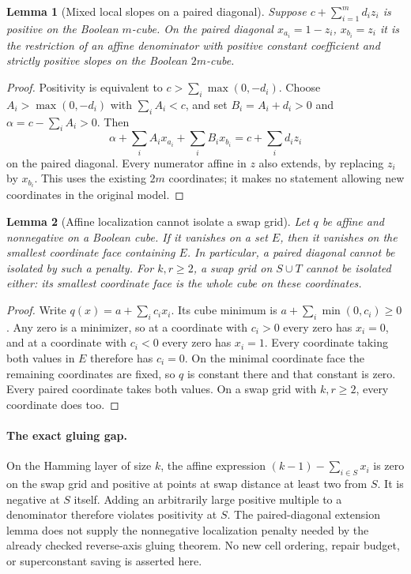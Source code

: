 \documentclass[11pt]{article}
\newtheorem{lemma}{Lemma}
\begin{document}
\begin{lemma}[Mixed local slopes on a paired diagonal]
Suppose $c+\sum_{i=1}^m d_i z_i$ is positive on the Boolean $m$-cube.
On the paired diagonal $x_{a_i}=1-z_i$, $x_{b_i}=z_i$ it is the
restriction of an affine denominator with positive constant coefficient
and strictly positive slopes on the Boolean $2m$-cube.
\end{lemma}
\begin{proof}
Positivity is equivalent to
$c>\sum_i\max(0,-d_i)$. Choose $A_i>\max(0,-d_i)$ with
$\sum_iA_i<c$, and set $B_i=A_i+d_i>0$ and
$\alpha=c-\sum_iA_i>0$. Then
\[
 \alpha+\sum_i A_ix_{a_i}+\sum_i B_ix_{b_i}
 =c+\sum_i d_iz_i
\]
on the paired diagonal. Every numerator affine in $z$ also extends,
by replacing $z_i$ by $x_{b_i}$. This uses the existing $2m$ coordinates;
it makes no statement allowing new coordinates in the original model.
\end{proof}

\begin{lemma}[Affine localization cannot isolate a swap grid]
Let $q$ be affine and nonnegative on a Boolean cube. If it vanishes on a
set $E$, then it vanishes on the smallest coordinate face containing $E$.
In particular, a paired diagonal cannot be isolated by such a penalty.
For $k,r\geq2$, a swap grid on $S\cup T$ cannot be isolated either:
its smallest coordinate face is the whole cube on these coordinates.
\end{lemma}
\begin{proof}
Write $q(x)=a+\sum_i c_ix_i$. Its cube minimum is
$a+\sum_i\min(0,c_i)\geq0$. Any zero is a minimizer, so at a coordinate
with $c_i>0$ every zero has $x_i=0$, and at a coordinate with $c_i<0$
every zero has $x_i=1$. Every coordinate taking both values in $E$
therefore has $c_i=0$. On the minimal coordinate face the remaining
coordinates are fixed, so $q$ is constant there and that constant is zero.
Every paired coordinate takes both values. On a swap grid with
$k,r\geq2$, every coordinate does too.
\end{proof}

\paragraph{The exact gluing gap.}
On the Hamming layer of size $k$, the affine expression
$(k-1)-\sum_{i\in S}x_i$ is zero on the swap grid and positive at points
at swap distance at least two from $S$. It is negative at $S$ itself.
Adding an arbitrarily large positive multiple to a denominator therefore
violates positivity at $S$. The paired-diagonal extension lemma does not
supply the nonnegative localization penalty needed by the already checked
reverse-axis gluing theorem. No new cell ordering, repair budget, or
superconstant saving is asserted here.
\end{document}
